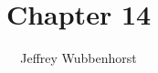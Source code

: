 \documentclass[10pt,letterpaper]{article}
\author{Jeffrey Wubbenhorst}
\title{Chapter 14}
\begin{document}
\maketitle


\begin{itemize}





\end{itemize}
\end{document}
